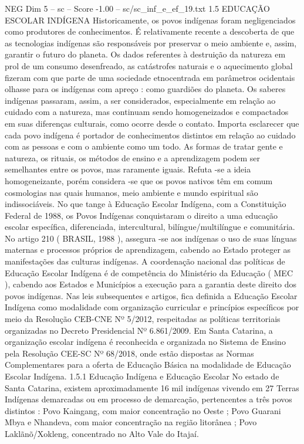 \begin{textsample}{NEG Dim 5 – sc – Score -1.00 – sc/sc\_inf\_e\_ef\_19.txt}  \label{ex:f5_neg_257}
1.5 EDUCAÇÃO ESCOLAR INDÍGENA Historicamente, os povos indígenas foram negligenciados como produtores de conhecimentos.
É relativamente recente a descoberta de que as tecnologias indígenas são responsáveis por preservar o meio ambiente e, assim, garantir o futuro do planeta.
Os dados referentes à destruição da natureza em prol de um consumo desenfreado, as catástrofes naturais e o aquecimento global fizeram com que parte de uma sociedade etnocentrada em parâmetros ocidentais olhasse para os indígenas com apreço : como guardiões do planeta.
Os saberes indígenas passaram, assim, a ser considerados, especialmente em relação ao cuidado com a natureza, mas continuam sendo homogeneizados e compactados em suas diferenças culturais, como ocorre desde o contato.
Importa esclarecer que cada povo indígena é portador de conhecimentos distintos em relação ao cuidado com as pessoas e com o ambiente como um todo.
As formas de tratar gente e natureza, os rituais, os métodos de ensino e a aprendizagem podem ser semelhantes entre os povos, mas raramente iguais.
Refuta -se a ideia homogeneizante, porém considera -se que os povos nativos têm em comum cosmologias nas quais humanos, meio ambiente e mundo espiritual são indissociáveis.
No que tange à Educação Escolar Indígena, com a Constituição Federal de 1988, os Povos Indígenas conquistaram o direito a uma educação escolar específica, diferenciada, intercultural, bilíngue/multilíngue e comunitária.
No artigo 210 ( BRASIL, 1988 ), assegura -se aos indígenas o uso de suas línguas maternas e processos próprios de aprendizagem, cabendo ao Estado proteger as manifestações das culturas indígenas.
A coordenação nacional das políticas de Educação Escolar Indígena é de competência do Ministério da Educação ( MEC ), cabendo aos Estados e Municípios a execução para a garantia deste direito dos povos indígenas.
Nas leis subsequentes e artigos, fica definida a Educação Escolar Indígena como modalidade com organização curricular e princípios específicos por meio da Resolução CEB-CNE Nº 5/2012, respeitadas as políticas territoriais organizadas no Decreto Presidencial Nº 6.861/2009.
Em Santa Catarina, a organização escolar indígena é reconhecida e organizada no Sistema de Ensino pela Resolução CEE-SC Nº 68/2018, onde estão dispostas as Normas Complementares para a oferta de Educação Básica na modalidade de Educação Escolar Indígena. 1.5.1 Educação Indígena e Educação Escolar No estado de Santa Catarina, existem aproximadamente 16 mil indígenas vivendo em 27 Terras Indígenas demarcadas ou em processo de demarcação, pertencentes a três povos distintos : Povo Kaingang, com maior concentração no Oeste ; Povo Guarani Mbya e Nhandeva, com maior concentração na região litorânea ; Povo Laklãnõ/Xokleng, concentrado no Alto Vale do Itajaí.

\end{textsample}
